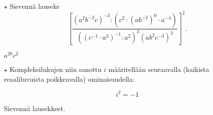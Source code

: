 \begin{tehtavasivu}
\begin{tehtava}
  		$\star$ Sievennä lauseke
$$\left[ \frac{(a^2b^{-2}c)^{-3}:\left(c^2\cdot (ab^{-2})^0 \cdot a^{-4}\right)}
{\left((c^{-1}\cdot a^3)^{-1}:a^2\right)^3(ab^2c^{-3})^3} \right]^2.$$
	\begin{vastaus}
	$a^{20}c^2$
	\end{vastaus}
\end{tehtava} 

\begin{tehtava}
$\star$ Kompleksilukujen niin sanottu  $i$ määritellään seuraavalla (kaikista reaaliluvuista poikkeavalla) ominaisuudella:

$$i^2=-1$$

Sievennä lausekkeet.

	\begin{vastaus}
	\end{vastaus}
\end{tehtava}

\end{tehtavasivu}
